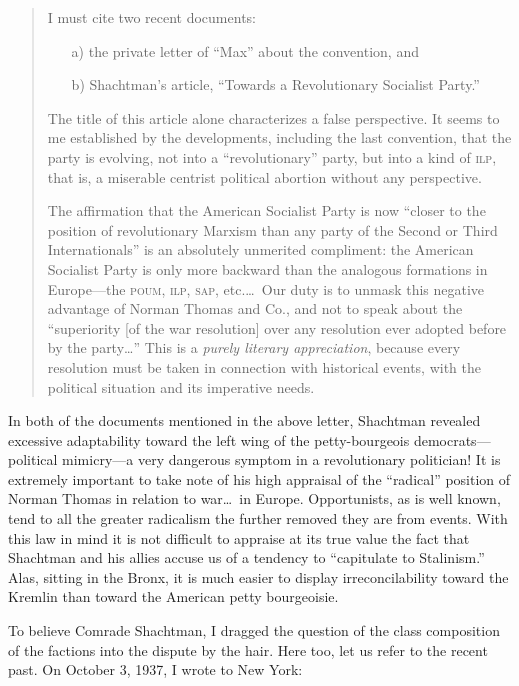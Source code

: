 \begin{quote}
  I must cite two recent documents:

  \begin{enumerate}
  	\item[a)] the private letter of ``Max'' about the convention, and
  	\item[b)] Shachtman’s article, ``Towards a Revolutionary Socialist Party.''
  \end{enumerate}

  The title of this article alone characterizes a false perspective. It seems to me established by the developments, including the last convention, that the party is evolving, not into a ``revolutionary'' party, but into a kind of \textsc{ilp}, that is, a miserable centrist political abortion without any perspective.

  The affirmation that the American Socialist Party is now ``closer to the position of revolutionary Marxism than any party of the Second or Third Internationals'' is an absolutely unmerited compliment: the American Socialist Party is only more backward than the analogous formations in Europe---the \textsc{poum}, \textsc{ilp}, \textsc{sap}, etc.\dots\ Our duty is to unmask this negative advantage of Norman Thomas and Co., and not to speak about the ``superiority [of the war resolution] over any resolution ever adopted before by the party\dots'' This is a \emph{purely literary appreciation}, because every resolution must be taken in connection with historical events, with the political situation and its imperative needs.
\end{quote}

In both of the documents mentioned in the above letter, Shachtman revealed excessive adaptability toward the left wing of the petty-bourgeois democrats---political mimicry---a very dangerous symptom in a revolutionary politician! It is extremely important to take note of his high appraisal of the “radical” position of Norman Thomas in relation to war\dots\ in Europe. Opportunists, as is well known, tend to all the greater radicalism the further removed they are from events. With this law in mind it is not difficult to appraise at its true value the fact that Shachtman and his allies accuse us of a tendency to “capitulate to Stalinism.” Alas, sitting in the Bronx, it is much easier to display irreconcilability toward the Kremlin than toward the American petty bourgeoisie.


\noindent
To believe Comrade Shachtman, I dragged the question of the class composition of the factions into the dispute by the hair. Here too, let us refer to the recent past.
On October 3, 1937, I wrote to New York:

